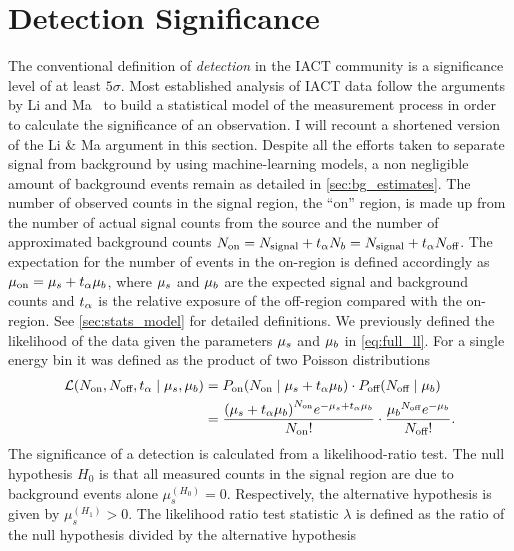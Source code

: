 \section{Detection Significance}
\label{sec:significance}
The conventional definition of \emph{detection} in the IACT community is a significance level of at least $5\sigma$.
Most established analysis of IACT data follow the arguments by Li and Ma~\cite{lima} to build a statistical model
of the measurement process in order to calculate the significance of an observation.
I will recount a shortened version of the Li \& Ma argument in this section.
Despite all the efforts taken to separate signal from background by using machine-learning models, 
a non negligible amount of background events remain as detailed in \cref{sec:bg_estimates}.
The number of observed counts in the signal region, the \enquote{on} region, is made up from the number 
of actual signal counts from the source and the number of approximated background counts $N_\text{on} =  N_{\text{signal}} + t_{\alpha} N_{b} = N_{\text{signal}} + t_{\alpha} N_\text{off}$.
The expectation for the number of events in the on-region is defined accordingly as $\mu_{\text{on}} = \mu_{s} + t_{\alpha} \mu_{b}$, where 
$\mu_{s}$ and $\mu_{b}$ are the expected signal and background counts and $t_{\alpha}$ is the relative exposure of the off-region compared with the on-region.
See \cref{sec:stats_model} for detailed definitions. 
We previously defined the likelihood of the data given the parameters $\mu_{s}$ and $\mu_{b}$ in \cref{eq:full_ll}.
For a single energy bin it was defined as the product of two Poisson distributions 
\begin{align*}
    \operatorname{\mathcal{L}} \left( \Non, \Noff, \talpha \mid \mus, \mub \right) &=  P_{\text{on}} \left(\Non \mid  \mus + \talpha \mub \right) \cdot P_{\text{off}} \left(\Noff \mid \mub \right)\\
    &= \frac{\left(\muon\right)^{\Non} e^{-{\muon}}}{\Non!} \cdot \frac{{\mub}^{\Noff} e^{-{\mub}}}{\Noff!}.
\end{align*}
The significance of a detection is calculated from a likelihood-ratio test. The null hypothesis $H_0$ is that all measured counts in the 
signal region are due to background events alone ${\mu^{(H_0)}_s} = 0$. Respectively, the alternative hypothesis is given by ${\mu^{(H_1)}_s} > 0$.
The likelihood ratio test statistic $\lambda$ is defined as the ratio of the null hypothesis divided by the alternative hypothesis
